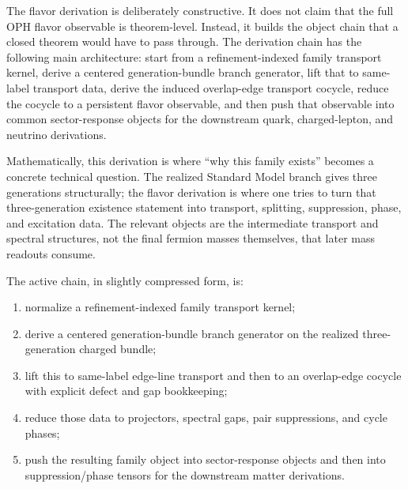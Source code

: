 \documentclass[11pt]{article}
\begin{document}
The flavor derivation is deliberately constructive. It does not claim that the full
OPH flavor observable is theorem-level. Instead, it builds the object chain that a
closed theorem would have to pass through. The derivation chain has the following main
architecture: start from a refinement-indexed family transport kernel, derive a centered
generation-bundle branch generator, lift that to same-label transport data, derive the induced
overlap-edge transport cocycle, reduce the cocycle to a persistent flavor observable, and then
push that observable into common sector-response objects for the downstream quark, charged-lepton,
and neutrino derivations.

Mathematically, this derivation is where ``why this family exists'' becomes a concrete technical
question. The realized Standard Model branch gives three generations structurally; the flavor
derivation is where one tries to turn that three-generation existence statement into transport,
splitting, suppression, phase, and excitation data. The relevant objects are the intermediate
transport and spectral structures, not the final fermion masses themselves, that later mass
readouts consume.

The active chain, in slightly compressed form, is:
\begin{enumerate}[leftmargin=2em]
\item normalize a refinement-indexed family transport kernel;
\item derive a centered generation-bundle branch generator on the realized three-generation
charged bundle;
\item lift this to same-label edge-line transport and then to an overlap-edge cocycle with
explicit defect and gap bookkeeping;
\item reduce those data to projectors, spectral gaps, pair suppressions, and cycle phases;
\item push the resulting family object into sector-response objects and then into
suppression/phase tensors for the downstream matter derivations.
\end{enumerate}
\end{document}
